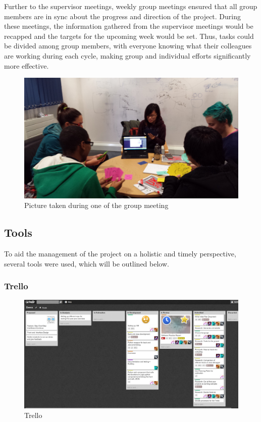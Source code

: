 \documentclass[11pt, a4paper]{article}
\begin{document}
Further to the supervisor meetings, weekly group meetings ensured that all group members are in sync about the progress and direction of the project.
During these meetings, the information gathered from the supervisor meetings would be recapped and the targets for the upcoming week would be set.
Thus, tasks could be divided among group members, with everyone knowing what their colleagues are working during each cycle, making group and individual efforts significantly more effective.
\begin{figure}[h!]
\centering
\includegraphics[width=130mm]{estimation.jpg}
\caption{Picture taken during one of the group meeting}
\end{figure}

\subsection{Tools}

To aid the management of the project on a holistic and timely perspective, several tools were used, which will be outlined below.

\subsubsection{Trello}
\begin{figure}[h!]
\centering
\includegraphics[width=\textwidth]{Trello.png}
\caption{Trello}
\label{fig:Trello}
\end{figure}
\end{document}
